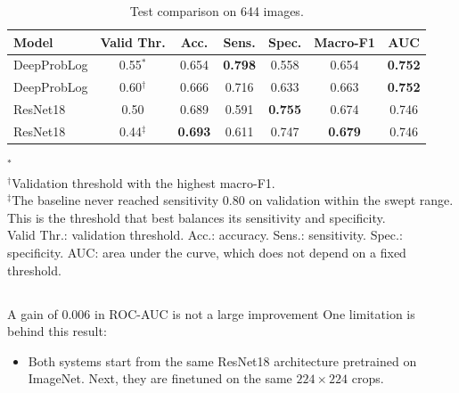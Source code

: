 \begin{table}[!t]
\caption{Test comparison on 644 images.}
\label{tab:comparison}
\centering
\footnotesize
\setlength{\tabcolsep}{4pt}
\begin{tabular}{@{}lcccccc@{}}
\toprule
Model & Valid Thr. & Acc. & Sens. & Spec. & Macro-F1 & AUC \\
\midrule
DeepProbLog & 0.55$^{*}$ & 0.654 & \textbf{0.798} & 0.558 & 0.654 & \textbf{0.752} \\
DeepProbLog & 0.60$^{\dagger}$ & 0.666 & 0.716 & 0.633 & 0.663 & \textbf{0.752} \\
ResNet18 & 0.50 & 0.689 & 0.591 & \textbf{0.755} & 0.674 & 0.746 \\
ResNet18 & 0.44$^{\ddagger}$ & \textbf{0.693} & 0.611 & 0.747 & \textbf{0.679} & 0.746 \\
\bottomrule
\end{tabular}

\vspace{0.45em}
\begin{minipage}{\columnwidth}
\footnotesize
$^{*}$\\
$^{\dagger}$Validation threshold with the highest macro-F1.\\
$^{\ddagger}$The baseline never reached sensitivity 0.80 on validation within the swept range. This is the threshold that best balances its sensitivity and specificity.\\
Valid Thr.: validation threshold. Acc.: accuracy. Sens.: sensitivity. Spec.: specificity. AUC: area under the curve, which does not depend on a fixed threshold.
\end{minipage}
\end{table}



\subsection{}
\label{sec:whysmall}

A gain of $0.006$ in ROC-AUC is not a large improvement One limitation is behind this result:
\begin{itemize}
\item Both systems start from the same ResNet18  architecture pretrained on ImageNet. Next, they are  finetuned on the same $224\times224$ crops.

\end{itemize}


